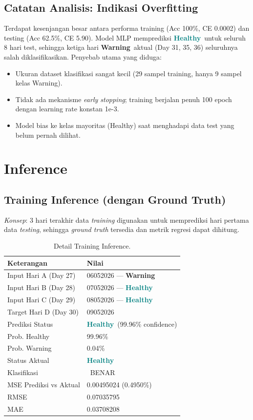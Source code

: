 \documentclass[11pt,a4paper]{article}
\newcommand{\healthy}{\textcolor{teal}{\textbf{Healthy}}}
\newcommand{\warning}{\textcolor{orange!80!black}{\textbf{Warning}}}
\newcommand{\ok}{\textcolor{teal}{\checkmark}}
\begin{document}
\subsection*{Catatan Analisis: Indikasi Overfitting}
Terdapat kesenjangan besar antara performa training (Acc 100\%, CE 0.0002) dan testing (Acc 62.5\%, CE 5.90). Model MLP memprediksi \healthy\ untuk seluruh 8 hari test, sehingga ketiga hari \warning\ aktual (Day 31, 35, 36) seluruhnya salah diklasifikasikan. Penyebab utama yang diduga:
\begin{itemize}
    \item Ukuran dataset klasifikasi sangat kecil (29 sampel training, hanya 9 sampel kelas Warning).
    \item Tidak ada mekanisme \textit{early stopping}; training berjalan penuh 100 epoch dengan learning rate konstan 1e-3.
    \item Model bias ke kelas mayoritas (Healthy) saat menghadapi data test yang belum pernah dilihat.
\end{itemize}

\newpage
\section{Inference}

\subsection{Training Inference (dengan Ground Truth)}
\textit{Konsep}: 3 hari terakhir data \textit{training} digunakan untuk memprediksi hari pertama data \textit{testing}, sehingga \textit{ground truth} tersedia dan metrik regresi dapat dihitung.

\begin{table}[H]
    \centering
    \caption{Detail Training Inference.}
    \begin{tabular}{ll}
        \toprule
        \textbf{Keterangan} & \textbf{Nilai} \\
        \midrule
        Input Hari A (Day 27) & 06052026 — \warning \\
        Input Hari B (Day 28) & 07052026 — \healthy \\
        Input Hari C (Day 29) & 08052026 — \healthy \\
        Target Hari D (Day 30) & 09052026 \\
        Prediksi Status & \healthy\ (99.96\% confidence) \\
        Prob. Healthy & 99.96\% \\
        Prob. Warning & 0.04\% \\
        Status Aktual & \healthy \\
        Klasifikasi & \ok\ BENAR \\
        MSE Prediksi vs Aktual & 0.00495024 (0.4950\%) \\
        RMSE & 0.07035795 \\
        MAE & 0.03708208 \\
        \bottomrule
    \end{tabular}
\end{table}
\end{document}
